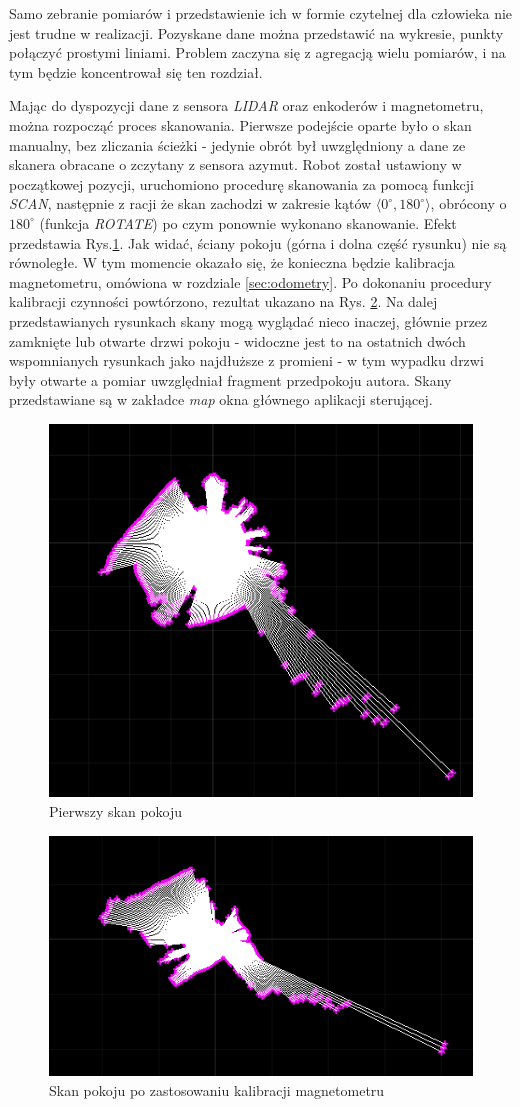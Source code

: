 Samo zebranie pomiarów i przedstawienie ich w formie czytelnej dla człowieka nie jest trudne w realizacji. Pozyskane dane można przedstawić na wykresie, punkty połączyć prostymi liniami. Problem zaczyna się z agregacją wielu pomiarów, i na tym będzie koncentrował się ten rozdział.

Mając do dyspozycji dane z sensora \emph{LIDAR} oraz enkoderów i magnetometru, można rozpocząć proces skanowania. Pierwsze podejście oparte było o skan manualny, bez zliczania ścieżki - jedynie obrót był uwzględniony a dane ze skanera obracane o zczytany z sensora azymut. Robot został ustawiony w początkowej pozycji, uruchomiono procedurę skanowania za pomocą funkcji \emph{SCAN}, następnie z racji że skan zachodzi w zakresie kątów $\langle0^{\circ},180^{\circ}\rangle$, obrócony o $180^{\circ}$ (funkcja \emph{ROTATE}) po czym ponownie wykonano skanowanie. Efekt przedstawia Rys.\ref{fig:first-scan}. Jak widać, ściany pokoju (górna i dolna część rysunku) nie są równoległe. W tym momencie okazało się, że konieczna będzie kalibracja magnetometru, omówiona w rozdziale \ref{sec:odometry}. Po dokonaniu procedury kalibracji czynności powtórzono, rezultat ukazano na Rys. \ref{fig:first-magnetom-calibrated-scan}. Na dalej przedstawianych rysunkach skany mogą wyglądać nieco inaczej, głównie przez zamknięte lub otwarte drzwi pokoju - widoczne jest to na ostatnich dwóch wspomnianych rysunkach jako najdłuższe z promieni - w tym wypadku drzwi były otwarte a pomiar uwzględniał fragment przedpokoju autora. Skany przedstawiane są w zakładce \emph{map} okna głównego aplikacji sterującej.

\begin{figure}[ht]
	\centering
		\includegraphics[width=0.5\linewidth]{rys/ScanBot-01-room-map-nocalibration.png}
	\caption{Pierwszy skan pokoju}
	\label{fig:first-scan}
\end{figure}

\begin{figure}[ht]
	\centering
		\includegraphics[width=0.5\linewidth]{rys/ScanBot-02-room-map-calibrated.png}
	\caption{Skan pokoju po zastosowaniu kalibracji magnetometru}
	\label{fig:first-magnetom-calibrated-scan}
\end{figure}

